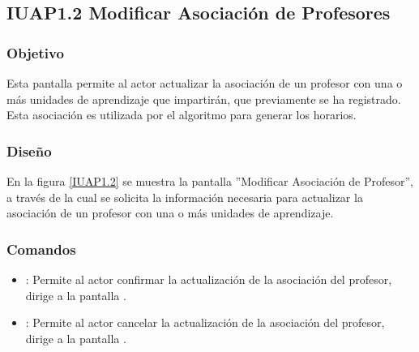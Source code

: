 \subsection{IUAP1.2 Modificar Asociación de Profesores}

\subsubsection{Objetivo}
	Esta pantalla permite al actor actualizar la asociación de un profesor con una o más unidades de aprendizaje que impartirán, que previamente se ha registrado. Esta asociación es utilizada por el algoritmo para generar los horarios.

\subsubsection{Diseño}

	En la figura \ref{IUAP1.2} se muestra la pantalla ''Modificar Asociación de Profesor'', a través de la cual se solicita la información necesaria para actualizar la asociación de un profesor con una o más unidades de aprendizaje.


\subsubsection{Comandos}
\begin{itemize}
	\item {}: Permite al actor confirmar la actualización de la asociación del profesor, dirige a la pantalla .
	
	\item {}: Permite al actor cancelar la actualización de la asociación del profesor, dirige a la pantalla .
\end{itemize}

